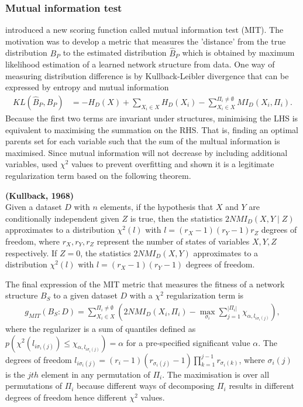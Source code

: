 \subsubsection{Mutual information test}
\cite{campos2006scoring} introduced a new scoring function called mutual information test (MIT). The motivation was to develop a metric that measures the 'distance' from the true distribution $B_P$ to the estimated distribution $\hat{B}_P$ which is obtained by maximum likelihood estimation of a learned network structure from data. One way of measuring distribution difference is by Kullback-Leibler divergence that can be expressed by entropy and mutual information
\begin{align*}
KL(\hat{B}_P, B_P) &= -H_D(X) + \sum_{X_i \in X} H_D(X_i) - \sum_{X_i \in X}^{\Pi_i \neq \emptyset} MI_D(X_i, \Pi_i).
\end{align*}
Because the first two terms are invariant under structures, minimising the LHS is equivalent to maximising the summation on the RHS. That is, finding an optimal parents set for each variable such that the sum of the multual information is maximised. Since mutual information will not decrease by including additional variables, \citeauthor{campos2006scoring} used $\chi^2$ values to prevent overfitting and shown it is a legitimate regularization term based on the following theorem.
\begin{theorem}\textbf{(Kullback, 1968)}\\
Given a dataset $D$ with $n$ elements, if the hypothesis that $X$ and $Y$ are conditionally independent given $Z$ is true, then the statistics $2NMI_D(X,Y\mid Z)$ approximates to a distribution $\chi^2(l)$ with $l=(r_X - 1)(r_Y - 1)r_Z$ degrees of freedom, where $r_X, r_Y, r_Z$ represent the number of states of variables $X, Y, Z$ respectively. If $Z=0$, the statistics $2NMI_D(X,Y)$ approximates to a distribution $\chi^2(l)$ with $l=(r_X - 1)(r_Y - 1)$ degrees of freedom.
\end{theorem}

The final expression of the MIT metric that measures the fitness of a network structure $B_S$ to a given dataset $D$ with a $\chi^2$ regularization term is 
\begin{align}
\label{eq:mit}
g_{MIT}(B_S : D) = \sum_{X_i \in X}^{\Pi_i \neq \emptyset} \left(2NMI_D(X_i, \Pi_i) - \max_{\sigma_i} \sum_{j=1}^{|\Pi_i|} \chi_{\alpha, l_{i\sigma_i(j)}}\right),
\end{align}
where the regularizer is a sum of quantiles defined as $p(\chi^2(l_{i\sigma_i(j)}) \le \chi_{\alpha, l_{i\sigma_i(j)}}) = \alpha$ for a pre-specified significant value $\alpha$. The degrees of freedom $l_{i\sigma_i(j)} = (r_i-1)(r_{\sigma_i(j)}-1)\prod_{k=1}^{j-1} r_{\sigma_i(k)}$, where $\sigma_i(j)$ is the $jth$ element in any permutation of $\Pi_i$. The maximisation is over all permutations of $\Pi_i$ because different ways of decomposing $\Pi_i$ results in different degrees of freedom hence different $\chi^2$ values. 

